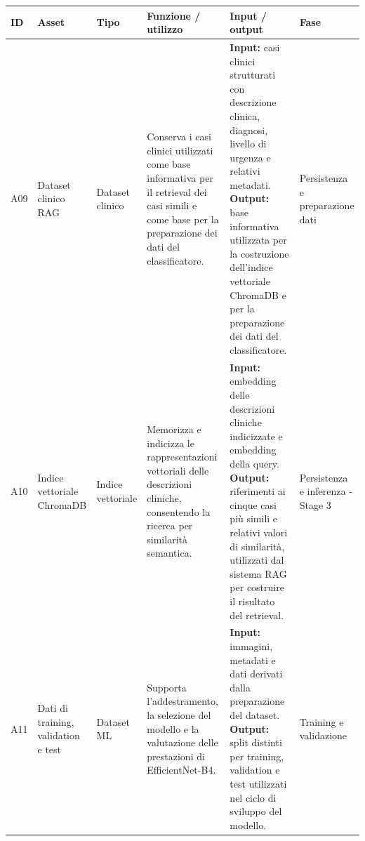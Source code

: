 \begin{table}[H]
    \centering
    \small
    \setlength{\tabcolsep}{4pt}
    \renewcommand{\arraystretch}{1.08}

    \begin{tabularx}{\textwidth}{
        >{\raggedright\arraybackslash}p{0.6cm}
        >{\raggedright\arraybackslash}p{2.5cm}
        >{\raggedright\arraybackslash}p{1.6cm}
        X
        X
        >{\raggedright\arraybackslash}p{1.8cm}
    }
        \toprule

        \textbf{ID} &
        \textbf{Asset} &
        \textbf{Tipo} &
        \textbf{Funzione / utilizzo} &
        \textbf{Input / output} &
        \textbf{Fase} \\

        \midrule

        A09 &
        Dataset clinico RAG &
        Dataset clinico &
        Conserva i casi clinici utilizzati come base informativa per il
        retrieval dei casi simili e come base per la preparazione dei dati
        del classificatore. &
        \textbf{Input:} casi clinici strutturati con descrizione clinica, diagnosi, livello di urgenza e relativi metadati.
        \textbf{Output:} base informativa utilizzata per la costruzione dell’indice vettoriale ChromaDB e per la preparazione dei dati del classificatore. &
        Persistenza e preparazione dati \\

        \midrule

        A10 &
        Indice vettoriale ChromaDB &
        Indice vettoriale &
        Memorizza e indicizza le rappresentazioni vettoriali delle descrizioni cliniche, consentendo la ricerca per similarità semantica. &
        \textbf{Input:} embedding delle descrizioni cliniche indicizzate e embedding della query.
        \textbf{Output:} riferimenti ai cinque casi più simili e relativi valori
        di similarità, utilizzati dal sistema RAG per costruire il risultato del
        retrieval. &
        Persistenza e inferenza - Stage 3 \\

        \midrule

        A11 &
        Dati di training, validation e test &
        Dataset ML &
        Supporta l'addestramento, la selezione del modello e la valutazione
        delle prestazioni di EfficientNet-B4. &
        \textbf{Input:} immagini, metadati e dati derivati dalla preparazione
        del dataset. \textbf{Output:} split distinti per training,
        validation e test utilizzati nel ciclo di sviluppo del modello. &
        Training e validazione \\


\end{tabularx}
\end{table}
